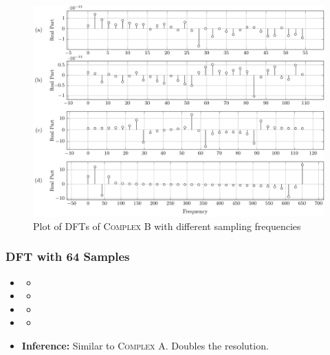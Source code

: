 \documentclass[../../course]{subfiles}
\begin{document}
\begin{figure} [H]
    \centering
     {
        \includegraphics[height = 0.8\textheight] {tikzpics/plotDftComplexB32.pdf}
    }
     {Plot of \textsc{DFT}s of \textsc{Complex B} with different sampling frequencies}
    \label{plt:dftComplexB}
\end{figure}

\subsubsection{DFT with 64 Samples}

\begin{itemize} [label=]

    \item \sampFreqMuchLess
        \begin{itemize} [label=]
            \item
        \end{itemize}

    \item \sampFreqNorm
        \begin{itemize} [label=]
            \item
        \end{itemize}

    \item \sampFreqSligGreat
        \begin{itemize} [label=]
            \item
        \end{itemize}

    \item \sampFreqMuchGreat
        \begin{itemize} [label=]
            \item
        \end{itemize}

    \item \textbf{Inference:} Similar to \textsc{Complex A}. Doubles the resolution.

\end{itemize}
\end{document}
